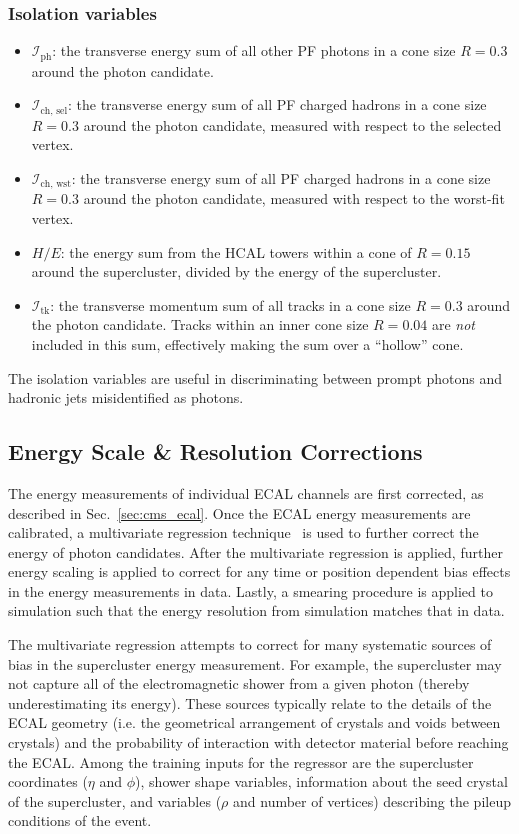\subsubsection*{Isolation variables}
\begin{itemize}
    \item $\mathcal I_{\text{ph}}$: the transverse energy sum of all other PF photons in a cone size $R=0.3$ around the photon candidate.
    \item $\mathcal I_{\text{ch, sel}}$: the transverse energy sum of all PF charged hadrons in a cone size $R=0.3$ around the photon candidate, measured with respect to the selected vertex.
    \item $\mathcal I_{\text{ch, wst}}$: the transverse energy sum of all PF charged hadrons in a cone size $R=0.3$ around the photon candidate, measured with respect to the worst-fit vertex.
    \item $H/E$: the energy sum from the HCAL towers within a cone of $R=0.15$ around the supercluster, divided by the energy of the supercluster.
    \item $\mathcal I_{\text{tk}}$: the transverse momentum sum of all tracks in a cone size $R=0.3$ around the photon candidate. Tracks within an inner cone size $R=0.04$ are \emph{not} included in this sum, effectively making the sum over a ``hollow'' cone.
\end{itemize}

The isolation variables are useful in discriminating between prompt photons and hadronic jets misidentified as photons.

\subsection{Energy Scale \& Resolution Corrections} \label{sec:evt_photon_energy}
The energy measurements of individual ECAL channels are first corrected, as described in Sec.~\ref{sec:cms_ecal}.
Once the ECAL energy measurements are calibrated, a multivariate regression technique~\cite{Khachatryan:2015iwa} is used to further correct the energy of photon candidates.
After the multivariate regression is applied, further energy scaling is applied to correct for any time or position dependent bias effects in the energy measurements in data.
Lastly, a smearing procedure is applied to simulation such that the energy resolution from simulation matches that in data.

The multivariate regression attempts to correct for many systematic sources of bias in the supercluster energy measurement.
For example, the supercluster may not capture all of the electromagnetic shower from a given photon (thereby underestimating its energy).
These sources typically relate to the details of the ECAL geometry (i.e. the geometrical arrangement of crystals and voids between crystals) and the probability of interaction with detector material before reaching the ECAL.
Among the training inputs for the regressor are the supercluster coordinates ($\eta$ and $\phi$), shower shape variables, information about the seed crystal of the supercluster, and variables ($\rho$ and number of vertices) describing the pileup conditions of the event. 

